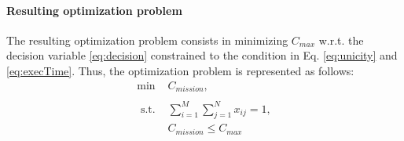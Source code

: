 \documentclass[conference,harvard,brazil,english]{sbatex}
\begin{document}
\paragraph{Resulting optimization problem}

The resulting optimization problem consists in minimizing $C_{max}$ w.r.t. the decision variable \eqref{eq:decision} constrained to the condition in Eq. \eqref{eq:unicity} and \eqref{eq:execTime}. Thus, the optimization problem is represented as follows:
%
\begin{equation}
	\label{eq:optproblem}
	\begin{array}{ccc}
		\min & C_{mission},  \\
  \\
		\textrm{ s.t. } & \sum_{i=1}^{M}{\sum_{j=1}^{N}{x_{ij}}}=1, \\
		& C_{mission}\leq C_{max}
 \\
	\end{array}
\end{equation}	
%
%
%
%
%
%
%
%
\end{document}
